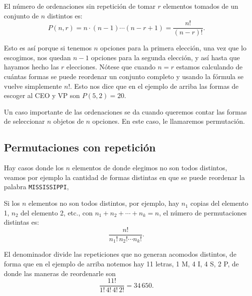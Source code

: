 El número de ordenaciones sin repetición de tomar $r$ elementos tomados de un conjunto de $n$ distintos es:
\[
P(n, r) = n \cdot (n-1) \cdots (n-r+1) = \frac{n!}{(n-r)!}.
\]

Esto es así porque si tenemos $n$ opciones para la primera elección, una vez que lo escogimos, nos quedan $n-1$ opciones para la segunda elección, y así hasta que hayamos hecho las $r$ elecciones. Nótese que cuando $n=r$ estamos calculando de cuántas formas se puede reordenar un conjunto completo y usando la fórmula se vuelve simplemente $n!$. Esto nos dice que en el ejemplo de arriba las formas de escoger al CEO y VP son $P(5,2)=20$.

Un caso importante de las ordenaciones se da cuando queremos contar las formas de seleccionar $n$ objetos de $n$ opciones. En este caso, le llamaremos permutación.

\subsection*{Permutaciones con repetición}

Hay casos donde los $n$ elementos de donde elegimos no son todos distintos, veamos por ejemplo la cantidad de formas distintas en que se puede reordenar la palabra \texttt{MISSISSIPPI},

Si los $n$ elementos no son todos distintos, por ejemplo, hay $n_1$ copias del elemento 1, $n_2$ del elemento 2, etc., con $n_1 + n_2 + \cdots + n_k = n$, el número de permutaciones distintas es:
\[
\frac{n!}{n_1!\, n_2! \cdots n_k!}.
\]

El denominador divide las repeticiones que no generan acomodos distintos, de forma que en el ejemplo de arriba notemos hay 11 letras, 1 M, 4 I, 4 S, 2 P, de donde las maneras de reordenarle son
\[
\dfrac{11!}{1!\,4!\,4!\,2!} = 34\,650.
\]

